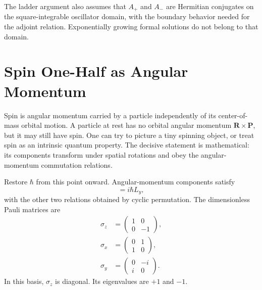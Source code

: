 \begin{classroomqa}
\end{classroomqa}

The ladder argument also assumes that \(A_{+}\) and \(A_{-}\) are Hermitian conjugates on the square-integrable oscillator domain, with the boundary behavior needed for the adjoint relation. Exponentially growing formal solutions do not belong to that domain.

\begin{classroomqa}
\end{classroomqa}

\section{Spin One-Half as Angular Momentum}

Spin is angular momentum carried by a particle independently of its center-of-mass orbital motion. A particle at rest has no orbital angular momentum \(\mathbf R\times\mathbf P\), but it may still have spin. One can try to picture a tiny spinning object, or treat spin as an intrinsic quantum property. The decisive statement is mathematical: its components transform under spatial rotations and obey the angular-momentum commutation relations.

Restore \(\hbar\) from this point onward. Angular-momentum components satisfy
\begin{equation}
[L_{z},L_{x}]=i\hbar L_{y},
\end{equation}
with the other two relations obtained by cyclic permutation. The dimensionless Pauli matrices are
\begin{equation}
\begin{aligned}
\sigma_{z}&=
\begin{pmatrix}
1&0\\
0&-1
\end{pmatrix},\\[0.4em]
\sigma_{x}&=
\begin{pmatrix}
0&1\\
1&0
\end{pmatrix},\\[0.4em]
\sigma_{y}&=
\begin{pmatrix}
0&-i\\
i&0
\end{pmatrix}.
\end{aligned}
\end{equation}
In this basis, \(\sigma_{z}\) is diagonal. Its eigenvalues are \(+1\) and
\(-1\).

